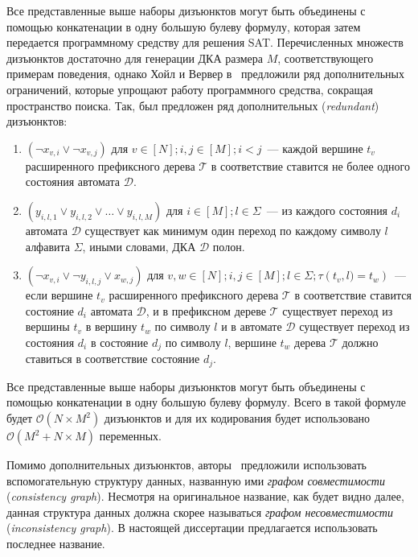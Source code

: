 Все представленные выше наборы дизъюнктов могут быть объединены с помощью конкатенации в одну большую булеву формулу, которая затем передается программному средству для решения SAT.
Перечисленных множеств дизъюнктов достаточно для генерации ДКА размера $M$, соответствующего примерам поведения, однако Хойл и Вервер в~\cite{heule-icgi10} предложили ряд дополнительных ограничений, которые упрощают работу программного средства, сокращая пространство поиска.
Так, был предложен ряд дополнительных (\emph{redundant}) дизъюнктов:
\begin{enumerate}
  \item $\left(\neg x_{v,i} \vee \neg x_{v,j}\right)$ для $v \in \left[N\right]; i,j \in \left[M\right]; i < j$~{---} каждой вершине $t_{v}$ расширенного префиксного дерева $\mathcal{T} $ в соответствие ставится не более одного состояния автомата $\mathcal{D}$.
  \item $\left(y_{i,l,1} \vee y_{i,l,2} \vee \ldots \vee y_{i,l,M}\right)$ для $i \in \left[M\right]; l \in \Sigma$~{---} из каждого состояния $d_{i}$ автомата $\mathcal{D}$ существует как минимум один переход по каждому символу $l$ алфавита $\Sigma$, иными словами, ДКА $\mathcal{D}$ полон.
  \item $\left(\neg x_{v,i} \vee \neg y_{i,l,j} \vee x_{w,j}\right)$ для $v,w \in \left[N\right]; i,j \in \left[M\right];l \in \Sigma; \tau\left(t_{v},l) = t_{w}\right)$~{---} если вершине $t_{v}$ расширенного префиксного дерева $\mathcal{T} $ в соответствие ставится состояние $d_{i}$ автомата $\mathcal{D}$, и в префиксном дереве $\mathcal{T}$ существует переход из вершины $t_{v}$ в вершину $t_{w}$ по символу $l$ и в автомате $\mathcal{D}$ существует переход из состояния $d_{i}$ в состояние $d_{j}$ по символу $l$, вершине $t_{w}$ дерева $\mathcal{T}$ должно ставиться в соответствие состояние $d_{j}$.
\end{enumerate}

Все представленные выше наборы дизъюнктов могут быть объединены с помощью конкатенации в одну большую булеву формулу. Всего в такой формуле будет $\mathcal{O}(N \times M^{2})$ дизъюнктов и для их кодирования будет использовано $\mathcal{O}(M^2 + N \times M)$ переменных.

Помимо дополнительных дизъюнктов, авторы~\cite{heule-icgi10} предложили использовать вспомогательную структуру данных, названную ими \emph{графом совместимости} (\emph{consistency graph}).
Несмотря на оригинальное название, как будет видно далее, данная структура данных должна скорее называться \emph{графом несовместимости} (\emph{inconsistency graph}).
В настоящей диссертации предлагается использовать последнее название.

